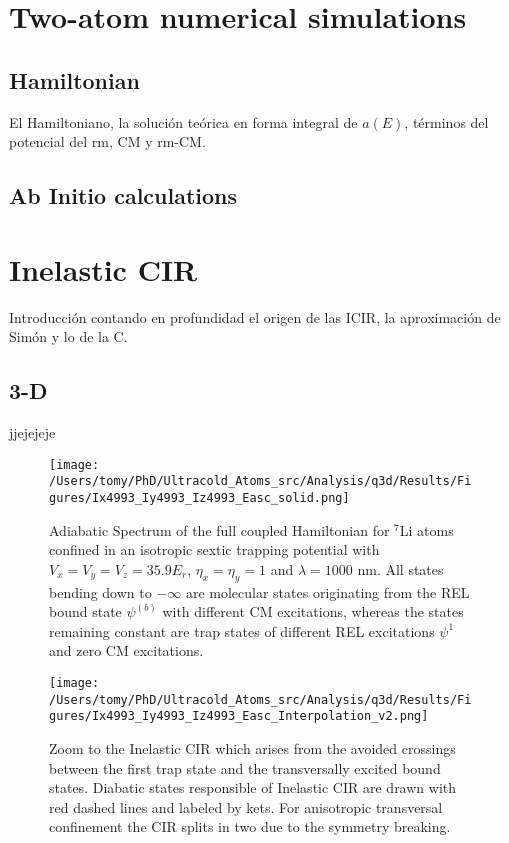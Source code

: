 \documentclass[aps,pre,twocolumn,superscriptaddress,showpacs]{revtex4-1}
\begin{document}
\section{Two-atom numerical simulations}  \label{sec:system}
\subsection{Hamiltonian}
El Hamiltoniano, la solución teórica en forma integral de $a(E)$, términos del potencial del rm, CM y rm-CM. \cite{PhysRevLett.104.153202}

\subsection{Ab Initio calculations}
\section{Inelastic CIR}  \label{sec:theory}
Introducción contando en profundidad el origen de las ICIR, la aproximación de Simón y lo de la C.

\subsection{3-D}
jjejejeje

	\begin{figure}[H]
   	 \centering
    	\texttt{[image: /Users/tomy/PhD/Ultracold\_Atoms\_src/Analysis/q3d/Results/Figures/Ix4993\_Iy4993\_Iz4993\_Easc\_solid.png]}
    	\caption{Adiabatic Spectrum of the full coupled Hamiltonian for $^7$Li atoms confined in an isotropic sextic trapping potential with $V_x = V_y = V_z = 35.9E_r$, $\eta_x = \eta_y = 1$ and $\lambda=1000$ nm. All states bending down to $-\infty$ are molecular states originating from the REL bound state $\psi^{(b)}$ with different CM excitations, whereas the states remaining constant are trap states of different REL excitations $\psi^{1}$ and zero CM excitations.}
    	\label{fig:3D spectrum}
	\end{figure}
	
	\begin{figure}[H]
   	 \centering
    	\texttt{[image: /Users/tomy/PhD/Ultracold\_Atoms\_src/Analysis/q3d/Results/Figures/Ix4993\_Iy4993\_Iz4993\_Easc\_Interpolation\_v2.png]}
    	\caption{Zoom to the Inelastic CIR which arises from the avoided crossings between the first trap state and the transversally excited bound states. Diabatic states responsible of Inelastic CIR are drawn with red dashed lines and labeled by kets. For anisotropic transversal confinement the CIR splits in two due to the symmetry breaking.}
    	\label{fig:Isotropic Crossings}
	\end{figure}
	
\end{document}
